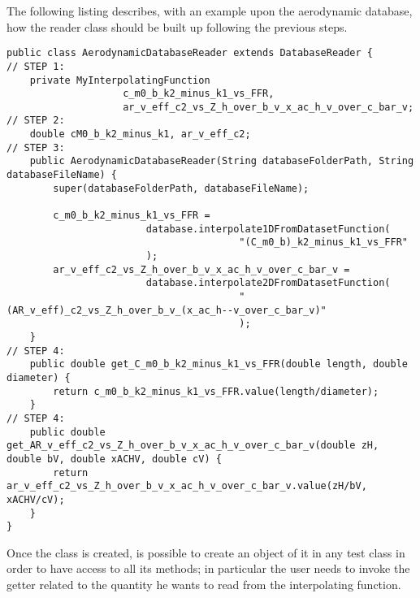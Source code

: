 \bigskip
\noindent
The following listing describes, with an example upon the aerodynamic database, how the reader class should be built up following the previous steps.
%
\lstset{language=Java}
\begin{lstlisting}[caption={DatabaseReader son class creation}, captionpos=t, tabsize=2]
public class AerodynamicDatabaseReader extends DatabaseReader {
// STEP 1:
	private MyInterpolatingFunction 
					c_m0_b_k2_minus_k1_vs_FFR,
					ar_v_eff_c2_vs_Z_h_over_b_v_x_ac_h_v_over_c_bar_v;
// STEP 2:
	double cM0_b_k2_minus_k1, ar_v_eff_c2;
// STEP 3:
	public AerodynamicDatabaseReader(String databaseFolderPath, String databaseFileName) {
		super(databaseFolderPath, databaseFileName);

		c_m0_b_k2_minus_k1_vs_FFR = 
						database.interpolate1DFromDatasetFunction(
										"(C_m0_b)_k2_minus_k1_vs_FFR"
						);
		ar_v_eff_c2_vs_Z_h_over_b_v_x_ac_h_v_over_c_bar_v =
						database.interpolate2DFromDatasetFunction(
										"(AR_v_eff)_c2_vs_Z_h_over_b_v_(x_ac_h--v_over_c_bar_v)"
										);
	}
// STEP 4:	
	public double get_C_m0_b_k2_minus_k1_vs_FFR(double length, double diameter) { 
		return c_m0_b_k2_minus_k1_vs_FFR.value(length/diameter);
	}
// STEP 4:
	public double get_AR_v_eff_c2_vs_Z_h_over_b_v_x_ac_h_v_over_c_bar_v(double zH, double bV, double xACHV, double cV) {
		return ar_v_eff_c2_vs_Z_h_over_b_v_x_ac_h_v_over_c_bar_v.value(zH/bV, xACHV/cV);
	}
}
\end{lstlisting}
%
\bigskip
\noindent
Once the class is created, is possible to create an object of it in any test class in order to have access to all its methods; in particular the user needs to invoke the getter related to the quantity he wants to read from the interpolating function. 